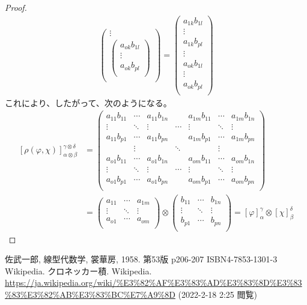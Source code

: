 \documentclass[dvipdfmx]{jsarticle}
\begin{document}
\begin{proof}
\begin{align*}
\begin{pmatrix}
 \vdots \\
\begin{pmatrix}
a_{ok}b_{1l} \\
 \vdots \\
a_{ok}b_{pl} \\
\end{pmatrix} \\
\end{pmatrix} = \begin{pmatrix}
a_{1k}b_{1l} \\
 \vdots \\
a_{1k}b_{pl} \\
 \vdots \\
a_{ok}b_{1l} \\
 \vdots \\
a_{ok}b_{pl} \\
\end{pmatrix}
\end{align*}
これにより、したがって、次のようになる。
\begin{align*}
\left[ \rho(\varphi,\chi) \right]^{\gamma \otimes \delta}_{\alpha \otimes \beta} &= \begin{pmatrix}
a_{11}b_{11} & \cdots & a_{11}b_{1n} & \  & a_{1m}b_{11} & \cdots & a_{1m}b_{1n} \\
 \vdots & \ddots & \vdots & \cdots & \vdots & \ddots & \vdots \\
a_{11}b_{p1} & \cdots & a_{11}b_{pn} & \  & a_{1m}b_{p1} & \cdots & a_{1m}b_{pn} \\
\  & \vdots & \  & \ddots & \  & \vdots & \  \\
a_{o1}b_{11} & \cdots & a_{o1}b_{1n} & \  & a_{om}b_{11} & \cdots & a_{om}b_{1n} \\
 \vdots & \ddots & \vdots & \cdots & \vdots & \ddots & \vdots \\
a_{o1}b_{p1} & \cdots & a_{o1}b_{pn} & \  & a_{om}b_{p1} & \cdots & a_{om}b_{pn} \\
\end{pmatrix}\\
&= \begin{pmatrix}
a_{11} & \cdots & a_{1m} \\
 \vdots & \ddots & \vdots \\
a_{o1} & \cdots & a_{om} \\
\end{pmatrix} \otimes \begin{pmatrix}
b_{11} & \cdots & b_{1n} \\
 \vdots & \ddots & \vdots \\
b_{p1} & \cdots & b_{pn} \\
\end{pmatrix} = [\varphi]^{\gamma}_{\alpha} \otimes [\chi]^{\delta}_{\beta}
\end{align*}
\end{proof}
\begin{thebibliography}{50}
  佐武一郎, 線型代数学, 裳華房, 1958. 第53版 p206-207 ISBN4-7853-1301-3
  Wikipedia. クロネッカー積. Wikipedia. \url{https://ja.wikipedia.org/wiki/%E3%82%AF%E3%83%AD%E3%83%8D%E3%83%83%E3%82%AB%E3%83%BC%E7%A9%8D} (2022-2-18 2:25 閲覧)
\end{thebibliography}
\end{document}
